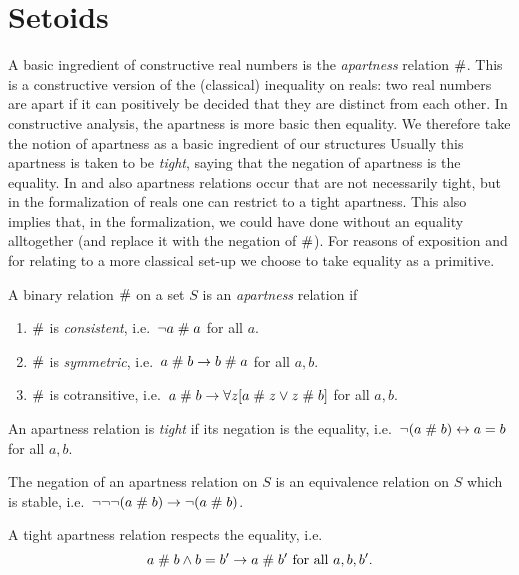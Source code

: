 \section{Setoids}
A basic ingredient of constructive real numbers is the {\em apartness\/}
relation $\mathrel{\#}$. This is a constructive version of the (classical)
inequality on reals: two real numbers are apart if it can positively
be decided that they are distinct from each other. In constructive analysis, the apartness is more basic then equality. We therefore take
the notion of apartness as a basic ingredient of our structures
Usually this apartness is taken to be {\em tight}, saying that the
negation of
apartness is the equality. In \cite{Ruit82} and \cite{MRR88} also
apartness relations occur that are not necessarily tight, but in the
formalization
of reals one can restrict to a tight apartness. This also implies that,
in the formalization, we could have done without an equality
alltogether (and replace it with the negation of $\mathrel{\#}$). For reasons
of exposition and for relating to a more classical set-up we choose to
take equality as a primitive.

\begin{definition}
A binary relation $\mathrel{\#}$ on a set $S$ is an {\em apartness\/}
relation if
\begin{enumerate}
\item $\mathrel{\#}$ is {\em consistent}, i.e.\ $\neg a \mathrel{\#} a$ for all $a$.
\item $\mathrel{\#}$ is {\em symmetric}, i.e.\ $ a \mathrel{\#} b \rightarrow b \mathrel{\#} a$
for
all $a, b$.
\item $\mathrel{\#}$ is cotransitive, i.e.\ $a\mathrel{\#} b \rightarrow\forall
z[a\mathrel{\#} z \vee z\mathrel{\#} b]$ for all $a, b$.
\end{enumerate}
An apartness relation is {\em tight\/} if its negation is the
equality, i.e.\ $\neg(a\mathrel{\#} b) \leftrightarrow a = b$ for all $a, b$.
\end{definition}

\begin{fact} The negation of an apartness relation on $S$ is an
equivalence relation on $S$ which is stable, i.e.\ $\neg\neg\neg(a\mathrel{\#} b) 
\rightarrow \neg(a\mathrel{\#} b)$.
\end{fact}

\begin{lemma}\label{lemaprespeq}
  A tight apartness relation respects the equality, i.e.
$$a\mathrel{\#} b \wedge b=b' \rightarrow a\mathrel{\#} b' \mbox{ for all } a,b,b'.$$
\end{lemma}

